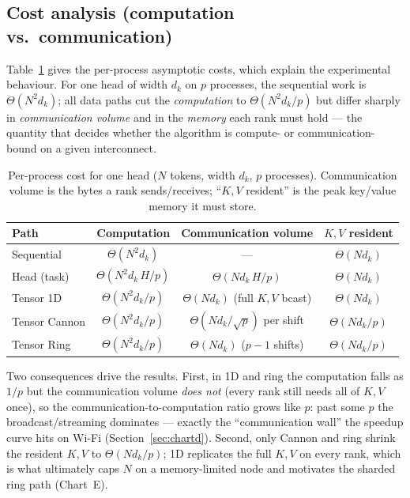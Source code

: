 \documentclass[11pt,a4paper]{article}
\begin{document}
\subsection{Cost analysis (computation vs.\ communication)}
\label{sec:cost}
Table~\ref{tab:cost} gives the per-process asymptotic costs, which explain the
experimental behaviour. For one head of width $d_k$ on $p$ processes, the
sequential work is $\Theta(N^2 d_k)$; all data paths cut the \emph{computation}
to $\Theta(N^2 d_k/p)$ but differ sharply in \emph{communication volume} and in
the \emph{memory} each rank must hold --- the quantity that decides whether the
algorithm is compute- or communication-bound on a given interconnect.

\begin{table}[H]
\centering\small
\caption{Per-process cost for one head ($N$ tokens, width $d_k$, $p$ processes).
Communication volume is the bytes a rank sends/receives; ``$K,V$ resident'' is the
peak key/value memory it must store.}\label{tab:cost}
\begin{tabular}{@{}lccc@{}}
\toprule
Path & Computation & Communication volume & $K,V$ resident \\
\midrule
Sequential        & $\Theta(N^2 d_k)$      & ---                              & $\Theta(N d_k)$   \\
Head (task)       & $\Theta(N^2 d_k\,H/p)$ & $\Theta(N d_k\,H/p)$            & $\Theta(N d_k)$   \\
Tensor 1D         & $\Theta(N^2 d_k/p)$    & $\Theta(N d_k)$ (full $K,V$ bcast) & $\Theta(N d_k)$   \\
Tensor Cannon     & $\Theta(N^2 d_k/p)$    & $\Theta(N d_k/\sqrt{p})$ per shift & $\Theta(N d_k/p)$ \\
Tensor Ring       & $\Theta(N^2 d_k/p)$    & $\Theta(N d_k)$ ($p{-}1$ shifts)   & $\Theta(N d_k/p)$ \\
\bottomrule
\end{tabular}
\end{table}

\noindent
Two consequences drive the results. First, in 1D and ring the computation falls
as $1/p$ but the communication volume \emph{does not} (every rank still needs all
of $K,V$ once), so the communication-to-computation ratio grows like $p$: past
some $p$ the broadcast/streaming dominates --- exactly the ``communication wall''
the speedup curve hits on Wi-Fi (Section~\ref{sec:chartd}). Second, only Cannon
and ring shrink the resident $K,V$ to $\Theta(N d_k/p)$; 1D replicates the full
$K,V$ on every rank, which is what ultimately caps $N$ on a memory-limited node
and motivates the sharded ring path (Chart~E).
\end{document}
